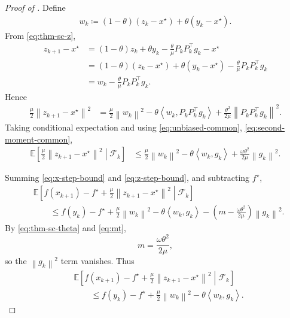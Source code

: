 \documentclass[10pt]{article}
\newcommand{\E}{\mathbb{E}}
\newcommand{\F}{\mathcal{F}}
\newcommand{\ip}[2]{\left\langle #1,#2\right\rangle}
\newcommand{\norm}[1]{\left\|#1\right\|}
\begin{document}
\begin{proof}[Proof of ]
Define
\begin{align}\label{w_def}
w_k \coloneqq (1-\theta)(z_k-x^\star) + \theta (y_k-x^\star).
\end{align}
From \eqref{eq:thm-sc-z},
\begin{align}
z_{k+1}-x^\star
&= (1-\theta)z_k+\theta y_k-\frac{\theta}{\mu}P_kP_k^\top g_k - x^\star \\
&= (1-\theta)(z_k-x^\star)+\theta(y_k-x^\star)-\frac{\theta}{\mu}P_kP_k^\top g_k \\
&= w_k - \frac{\theta}{\mu}P_kP_k^\top g_k.
\end{align}
Hence
\begin{align}
\frac{\mu}{2}\norm{z_{k+1}-x^\star}^2
&= \frac{\mu}{2}\norm{w_k}^2
   - \theta \ip{w_k}{P_kP_k^\top g_k}
   + \frac{\theta^2}{2\mu}\norm{P_kP_k^\top g_k}^2.
\end{align}
Taking conditional expectation and using \eqref{eq:unbiased-common}, \eqref{eq:second-moment-common},
\begin{align}
\E\!\left[\frac{\mu}{2}\norm{z_{k+1}-x^\star}^2\middle|\F_k\right]
&\le \frac{\mu}{2}\norm{w_k}^2
    - \theta \ip{w_k}{g_k}
    + \frac{\omega\theta^2}{2\mu}\norm{g_k}^2.
\label{eq:z-step-bound}
\end{align}


Summing \eqref{eq:x-step-bound} and \eqref{eq:z-step-bound}, and subtracting $f^\star$,
\begin{align}
&\E\!\left[f(x_{k+1})-f^\star+\frac{\mu}{2}\norm{z_{k+1}-x^\star}^2 \middle|\F_k\right] \nonumber\\
&\qquad \le
f(y_k)-f^\star + \frac{\mu}{2}\norm{w_k}^2 - \theta\ip{w_k}{g_k}
-\left(m-\frac{\omega\theta^2}{2\mu}\right)\norm{g_k}^2.
\label{eq:sum-before-cancel}
\end{align}
By \eqref{eq:thm-sc-theta} and \eqref{eq:mt},
\[
m=\frac{\omega\theta^2}{2\mu},
\]
so the $\norm{g_k}^2$ term vanishes. Thus
\begin{align}
&\E\!\left[f(x_{k+1})-f^\star+\frac{\mu}{2}\norm{z_{k+1}-x^\star}^2 \middle|\F_k\right]
\label{eq:after-cancel}\\
&\qquad \le
f(y_k)-f^\star + \frac{\mu}{2}\norm{w_k}^2 - \theta\ip{w_k}{g_k}. \nonumber
\end{align}



\end{proof}
\end{document}
